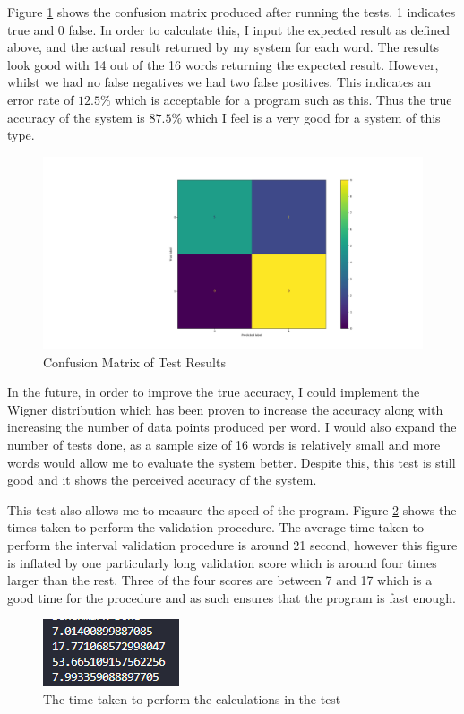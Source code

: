 \documentclass[10pt,a4paper]{report}
\begin{document}
Figure \ref{fig:ConfMat} shows the confusion matrix produced after running the tests. 1 indicates true and 0 false. In order to calculate this, I input the expected result as defined above, and the actual result returned by my system for each word. The results look good with 14 out of the 16 words returning the expected result. However, whilst we had no false negatives we had two false positives. This indicates an error rate of \(12.5\%\) which is acceptable for a program such as this. Thus the true accuracy of the system is \(87.5\%\) which I feel is a very good for a system of this type.
\begin{figure}
	\centering
	\includegraphics[scale=0.48]{ConfMatrixTest2}
	\caption{Confusion Matrix of Test Results}
	\label{fig:ConfMat}
\end{figure}

In the future, in order to improve the true accuracy, I could implement the Wigner distribution which has been proven to increase the accuracy along with increasing the number of data points produced per word. I would also expand the number of tests done, as a sample size of 16 words is relatively small and more words would allow me to evaluate the system better. Despite this, this test is still good and it shows the perceived accuracy of the system.

This test also allows me to measure the speed of the program. Figure \ref{fig:Time} shows the times taken to perform the validation procedure. The average time taken to perform the interval validation procedure is around 21 second, however this figure is inflated by one particularly long validation score which is around four times larger than the rest. Three of the four scores are between 7 and 17 which is a good time for the procedure and as such ensures that the program is fast enough.

\begin{figure}
	\centering
	\includegraphics{Time}
	\caption{The time taken to perform the calculations in the test}
	\label{fig:Time}
\end{figure}
\end{document}
